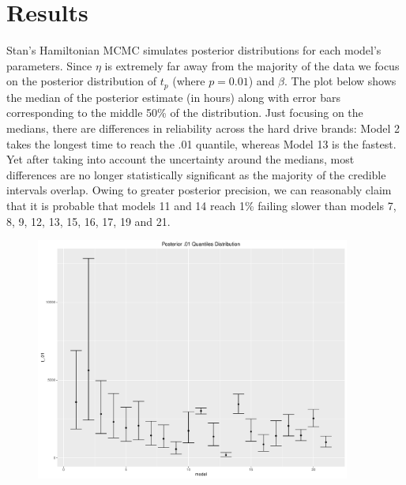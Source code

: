 \documentclass{scrartcl}
\begin{document}
\section*{Results}
Stan's Hamiltonian MCMC simulates posterior distributions for each model's parameters.  Since $\eta$ is extremely far away from the majority of the data we focus on the posterior distribution of $t_p$ (where $p=0.01$) and $\beta$.  The plot below shows the median of the posterior estimate (in hours) along with error bars corresponding to the middle 50\% of the distribution.  Just focusing on the medians, there are differences in reliability across the hard drive brands: Model 2 takes the longest time to reach the .01 quantile, whereas Model 13 is the fastest.  Yet after taking into account the uncertainty around the medians, most differences are no longer statistically significant as the majority of the credible intervals overlap. Owing to greater posterior precision, we can reasonably claim that it is probable that models 11 and 14 reach 1\% failing slower than models 7, 8, 9, 12, 13, 15, 16, 17, 19 and 21.
\begin{figure}[H]
\centering
\includegraphics[height=8cm]{postquant.pdf}
\end{figure}
\end{document}

